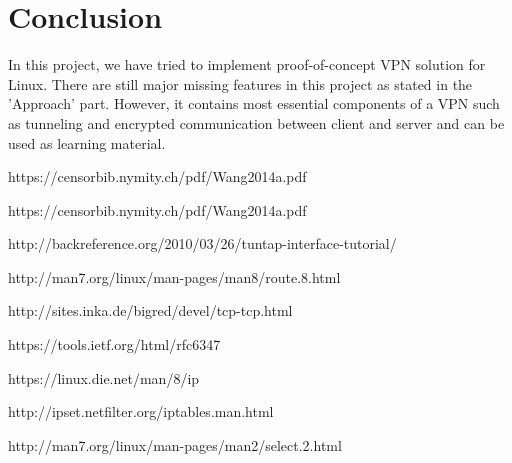 \documentclass[letterpaper, 10 pt, conference]{ieeeconf}  %
\begin{document}
\section{Conclusion}

In this project, we have tried to implement proof-of-concept VPN solution for Linux. There are still major missing features in this project as stated in the 'Approach' part. However, it contains most essential components of a VPN such as tunneling and encrypted communication between client and server and can be used as learning material. 








\begin{thebibliography}{99}

 https://censorbib.nymity.ch/pdf/Wang2014a.pdf

 https://censorbib.nymity.ch/pdf/Wang2014a.pdf

 http://backreference.org/2010/03/26/tuntap-interface-tutorial/

 http://man7.org/linux/man-pages/man8/route.8.html

 http://sites.inka.de/bigred/devel/tcp-tcp.html

 https://tools.ietf.org/html/rfc6347

 https://linux.die.net/man/8/ip

 http://ipset.netfilter.org/iptables.man.html

http://man7.org/linux/man-pages/man2/select.2.html

\end{thebibliography}
\end{document}
